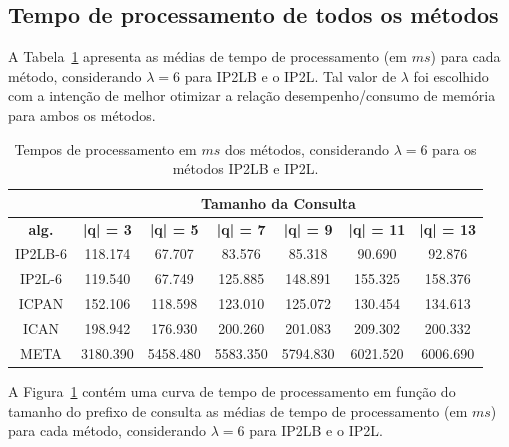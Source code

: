 \subsection{Tempo de processamento de todos os métodos}

A Tabela~\ref{tab:performance-usaddr-tau-3} apresenta as médias de tempo de processamento (em $ms$) para cada método, considerando $\lambda=6$ para IP2LB e o IP2L. Tal valor de $\lambda$ foi escolhido com a intenção de melhor otimizar a relação desempenho/consumo de memória para ambos os métodos. 

\begin{table}[ht]
\centering
\begin{tabular}{c|c|c|c|c|c|c|}
\cline{2-7}
 & \multicolumn{6}{c|}{\textbf{Tamanho da Consulta}} \\ \hline
\multicolumn{1}{|c|}{\textbf{alg.}} & \textbf{|q| = 3} & \textbf{|q| = 5} & \textbf{|q| = 7} & \textbf{|q| = 9} & \textbf{|q| = 11} & \textbf{|q| = 13} \\ \hline
\multicolumn{1}{|c|}{IP2LB-6} & 118.174 & 67.707 & 83.576 & 85.318 & 90.690 & 92.876 \\ \hline
\multicolumn{1}{|c|}{IP2L-6} & 119.540 & 67.749 & 125.885 & 148.891 & 155.325 & 158.376 \\ \hline
\multicolumn{1}{|c|}{ICPAN} & 152.106 & 118.598 & 123.010 & 125.072 & 130.454 & 134.613 \\ \hline
\multicolumn{1}{|c|}{ICAN} & 198.942 & 176.930 & 200.260 & 201.083 & 209.302 & 200.332 \\ \hline
\multicolumn{1}{|c|}{META} & 3180.390 & 5458.480 & 5583.350 & 5794.830 & 6021.520 & 6006.690 \\ \hline
\end{tabular}
\caption{Tempos de processamento em $ms$ dos métodos, considerando $\lambda = 6$ para os métodos IP2LB e IP2L.}
\label{tab:performance-usaddr-tau-3}
\end{table}

A Figura~\ref{tab:performance-usaddr-tau-3} contém uma curva de tempo de processamento em função do tamanho do prefixo de consulta as médias de tempo de processamento (em $ms$) para cada método, considerando $\lambda=6$ para IP2LB e o IP2L.

